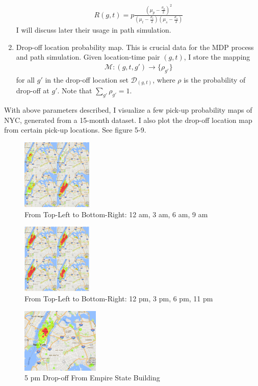 \documentclass[letterpaper, 10 pt, conference]{ieeeconf}
\begin{document}
\begin{enumerate}
\begin{align}
R(g, t) = p\frac{(\mu_p-\frac{\sigma_p}{2})^2}{(\mu_t-\frac{\sigma_t}{2})(\mu_s-\frac{\sigma_s}{2})}
\end{align}
I will discuss later their usage in path simulation. 
\item Drop-off location probability map. This is crucial data for the MDP process and path simulation. Given location-time pair $(g, t)$, I store the mapping 
\begin{align}
\mathcal{M}:(g,t,g')\to \{\rho_{g'}\}
\end{align}
for all $g'$ in the drop-off location set $\mathcal{D}_{(g,t)}$, where $\rho$ is the probability of drop-off at $g'$. Note that $\sum_{g'}\rho_{g'}=1$.
\end{enumerate}
With above parameters described, I visualize a few pick-up probability maps of NYC, generated from a 15-month dataset. I also plot the drop-off location map from certain pick-up locations. See figure 5-9.
\begin{figure}
\centering
\includegraphics[width=0.3\textwidth]{0-9.jpg}
\caption{From Top-Left to Bottom-Right: 12 am, 3 am, 6 am, 9 am}
\end{figure}
\begin{figure}
\centering
\includegraphics[width=0.3\textwidth]{12-23.jpg}
\caption{From Top-Left to Bottom-Right: 12 pm, 3 pm, 6 pm, 11 pm}
\end{figure}
\begin{figure}
\centering
\includegraphics[width=0.33\textwidth]{5pm-empire-state.png}
\caption{5 pm Drop-off From Empire State Building}
\end{figure}
\end{document}
